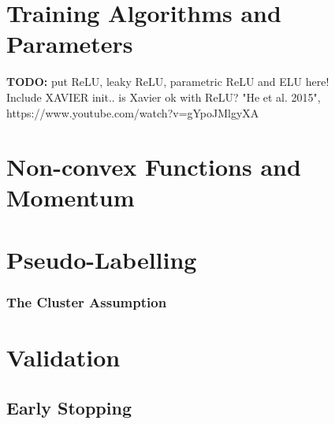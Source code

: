 	\section {Training Algorithms and Parameters}
	\label{act_funcs}
	\textbf{TODO:} put ReLU, leaky ReLU, parametric ReLU and ELU here!\\ Include XAVIER init.. is Xavier ok with ReLU? "He et al. 2015", https://www.youtube.com/watch?v=gYpoJMlgyXA
	
	\section{Non-convex Functions and Momentum}

	\section {Pseudo-Labelling}

		\subsubsection {The Cluster Assumption}

	\section {Validation}
		
		\subsection{Early Stopping}